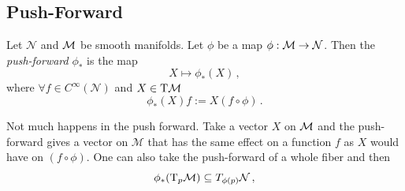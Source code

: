 \documentclass[11pt, a4paper, twocolumn]{article} %
\begin{document}
\subsection{Push-Forward}
\begin{defn}
    Let $\mathcal{N}$ and $\mathcal{M}$ be smooth manifolds.
    Let $\phi$ be a map $\phi: \mathcal{M} \to \mathcal{N}$.
    Then the \textit{push-forward} $\phi_*$ is the map
    \begin{equation}
        X \mapsto \phi_*(X)\,,
    \end{equation}
    where $\forall f \in C^\infty(\mathcal{N})$ and $X\in \T\M$
    \begin{equation}
        \phi_*(X)f:= X(f\circ \phi)\,.
    \end{equation}
\end{defn}
\begin{center}
\end{center}
\begin{center}
\end{center}
\begin{note}
    Not much happens in the push forward.
    Take a vector $X$ on $\mathcal{M}$ and the push-forward gives a vector on $\mathcal{M}$
    that has the same effect on a function $f$ as $X$ would have on $(f\circ\phi)$.
    One can also take the push-forward of a whole fiber and then
    \begin{equation}
        \phi_*(\T_p\M) \subseteq T_{\phi(p)}\mathcal{N}\,,
    \end{equation}
\end{note}
\end{document}
